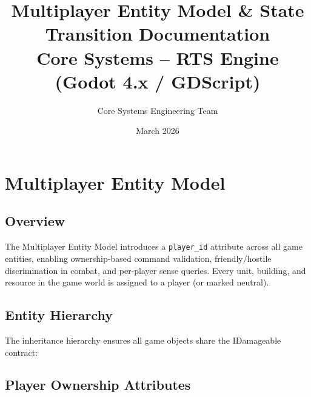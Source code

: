 \documentclass[11pt,a4paper]{article}
\title{Multiplayer Entity Model \& State Transition Documentation\\
\large Core Systems -- RTS Engine (Godot 4.x / GDScript)}
\author{Core Systems Engineering Team}
\date{March 2026}
\begin{document}
\maketitle
\tableofcontents
\newpage

\section{Multiplayer Entity Model}

\subsection{Overview}

The Multiplayer Entity Model introduces a \texttt{player\_id} attribute across
all game entities, enabling ownership-based command validation, friendly/hostile
discrimination in combat, and per-player sense queries. Every unit, building,
and resource in the game world is assigned to a player (or marked neutral).

\subsection{Entity Hierarchy}

The inheritance hierarchy ensures all game objects share the IDamageable
contract:

\begin{center}
\end{center}

\subsection{Player Ownership Attributes}
\end{document}
